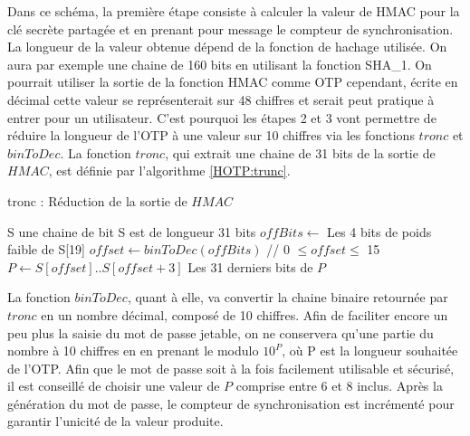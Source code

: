 \documentclass{../res/univ-projet}
\begin{document}
  Dans ce schéma, la première étape consiste à calculer la valeur de HMAC pour la clé secrète partagée et en prenant pour message le compteur de synchronisation. La 
  longueur de la valeur obtenue dépend de la fonction de hachage utilisée. On aura par exemple une chaine de 160 bits en utilisant la fonction SHA\_1.
  On pourrait utiliser la sortie de la fonction HMAC comme OTP cependant, écrite en décimal cette valeur se représenterait sur 48 chiffres et serait peut pratique à entrer 
  pour un utilisateur. C'est pourquoi les étapes 2 et 3 vont permettre de réduire la longueur de l'OTP à une valeur sur 10 chiffres via les fonctions $tronc$ et 
  $binToDec$. La fonction $tronc$, qui extrait une chaine de 31 bits de la sortie de $HMAC$, est définie par l'algorithme \ref{HOTP:trunc}.
  
  \begin{algorithm}
    \caption{tronc : Réduction de la sortie de $HMAC$}
    \label{HOTP:trunc}
    
    \begin{algorithmic}
      \REQUIRE S une chaine de bit
      \ENSURE S est de longueur 31 bits
      \STATE $offBits \leftarrow$ Les 4 bits de poids faible de S[19]
      \STATE $offset \leftarrow binToDec(offBits)$ // 0 $\leq offset \leq$ 15
      \STATE $P \leftarrow S[offset]..S[offset + 3]$ \newline
      \RETURN Les 31 derniers bits de $P$
    \end{algorithmic}
  \end{algorithm}

  La fonction $binToDec$, quant à elle, va convertir la chaine binaire retournée par $tronc$ en un nombre décimal, composé de 10 chiffres. Afin de faciliter encore un peu 
  plus la saisie du mot de passe jetable, on ne conservera qu'une partie du nombre à 10 chiffres en en prenant le modulo $10^P$, o\`u P est la longueur souhaitée de l'OTP.
  Afin que le mot de passe soit à la fois facilement utilisable et sécurisé, il est conseillé de choisir une valeur de $P$ comprise entre 6 et 8 inclus.
  Après la génération du mot de passe, le compteur de synchronisation est incrémenté pour garantir l'unicité de la valeur produite.
  
\end{document}
